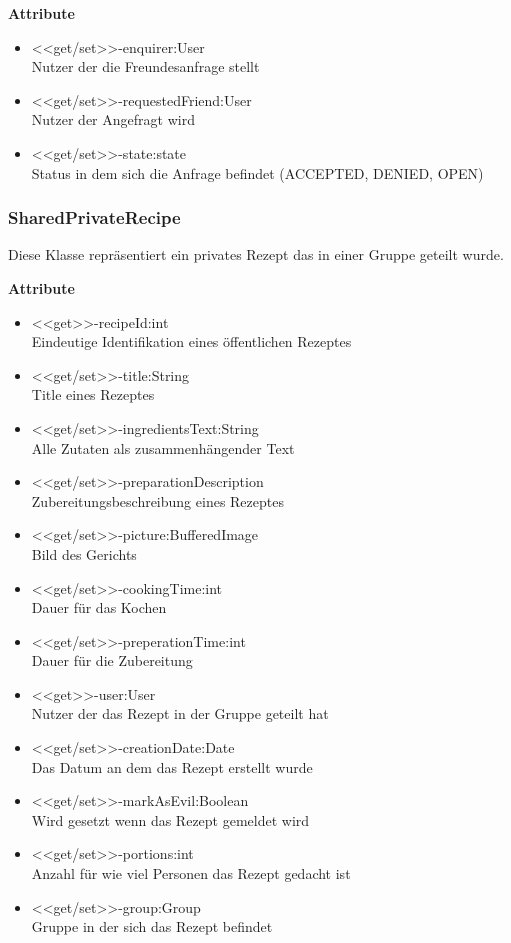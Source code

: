 \textbf{Attribute}
\begin{itemize}
	\item <<get/set>>-enquirer:User \\Nutzer der die Freundesanfrage stellt
	\item <<get/set>>-requestedFriend:User \\Nutzer der Angefragt wird
	\item <<get/set>>-state:state \\Status in dem sich die Anfrage befindet (ACCEPTED, DENIED, OPEN)
\end{itemize}

\subsubsection{SharedPrivateRecipe}
Diese Klasse repräsentiert ein privates Rezept das in einer Gruppe geteilt wurde.

\textbf{Attribute}
\begin{itemize}
	\item <<get>>-recipeId:int\\Eindeutige Identifikation eines öffentlichen Rezeptes
	\item <<get/set>>-title:String\\Title eines Rezeptes
	\item <<get/set>>-ingredientsText:String\\Alle Zutaten als zusammenhängender Text
	\item <<get/set>>-preparationDescription\\Zubereitungsbeschreibung eines Rezeptes
	\item <<get/set>>-picture:BufferedImage\\Bild des Gerichts
	\item <<get/set>>-cookingTime:int\\Dauer für das Kochen
	\item <<get/set>>-preperationTime:int\\Dauer für die Zubereitung
	\item <<get>>-user:User \\Nutzer der das Rezept in der Gruppe geteilt hat
	\item <<get/set>>-creationDate:Date\\Das Datum an dem das Rezept erstellt wurde
	\item <<get/set>>-markAsEvil:Boolean \\Wird gesetzt wenn das Rezept gemeldet wird
	\item <<get/set>>-portions:int\\Anzahl für wie viel Personen das Rezept gedacht ist
	\item <<get/set>>-group:Group \\Gruppe in der sich das Rezept befindet
\end{itemize}

